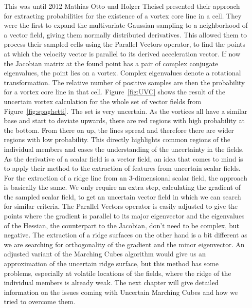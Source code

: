 \indent This was until 2012 Mathias Otto und Holger Theisel presented
their approach for extracting probabilities for the existence of a
vortex core line in a cell. They were the first to expand the
multivariate Gaussian sampling to a neighborhood of a vector field,
giving them normally distributed derivatives. This allowed them to
process their sampled cells using the Parallel Vectors operator, to find
the points at which the velocity vector is parallel to its derived
acceleration vector. If now the Jacobian matrix at the found point has a
pair of complex conjugate eigenvalues, the point lies on a vortex.
Complex eigenvalues denote a rotational transformation. The relative
number of positive samples are then the probability for a vortex core
line in that cell. Figure~\ref{fig:UVC} shows the result of the
uncertain vortex calculation for the whole set of vector fields from
Figure~\ref{fig:spaghetti}. The set is very uncertain. As the vortices
all have a similar base and start to deviate upwards, there are red
regions with high probability at the bottom. From there on up, the lines
spread and therefore there are wider regions with low probability. This
directly highlights common regions of the individual members and eases
the understanding of the uncertainty in the fields.\\
\indent As the derivative of a scalar field is a vector field, an idea
that comes to mind is to apply their method to the extraction of
features from uncertain scalar fields. For the extraction of a ridge
line from an 3-dimensional scalar field, the approach is basically the
same. We only require an extra step, calculating the gradient of the
sampled scalar field, to get an uncertain vector field in which we can
search for similar criteria. The Parallel Vectors operator is easily
adjusted to give the points where the gradient is parallel to its major
eigenvector and the eigenvalues of the Hessian, the counterpart to the
Jacobian, don't need to be complex, but negative. The extraction of a
ridge surfaces on the other hand is a bit different as we are searching
for orthogonality of the gradient and the minor eigenvector. An adjusted
variant of the Marching Cubes algorithm would give us an approximation
of the uncertain ridge surface, but this method has some problems,
especially at volatile locations of the fields, where the ridge of the
individual members is already weak. The next chapter will give detailed
information on the issues coming with Uncertain Marching Cubes and how
we tried to overcome them.


